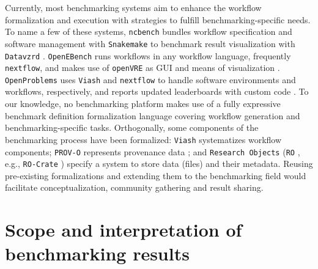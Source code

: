 \documentclass[11pt]{article}
\begin{document}
Currently, most benchmarking systems aim to enhance the workflow formalization and execution with strategies to fulfill benchmarking-specific needs. To name a few of these systems, \texttt{ncbench} bundles workflow specification and software management with \texttt{Snakemake} to benchmark result visualization with \texttt{Datavzrd} \cite{Hanssen2023-uf}. \texttt{OpenEBench} runs workflows in any workflow language, frequently \texttt{nextflow}, and makes use of \texttt{openVRE} as GUI and means of visualization \cite{Capella-Gutierrez2017-dh}. \texttt{OpenProblems} uses \texttt{Viash} \cite{cannoodt2024viash} and \texttt{nextflow} to handle software environments and workflows, respectively, and reports updated leaderboards with custom code \cite{luecken2025open}. To our knowledge, no benchmarking platform makes use of a fully expressive benchmark definition formalization language covering workflow generation and benchmarking-specific tasks. Orthogonally, some components of the benchmarking process have been formalized: \texttt{Viash} \cite{cannoodt2024viash} systematizes workflow components; \texttt{PROV-O} represents provenance data \cite{LeboUnknown-om}; and \texttt{Research Objects} (\texttt{RO} \cite{bechhofer2013linked}, e.g., \texttt{RO-Crate} \cite{soiland2022packaging}) specify a system to store data (files) and their metadata. Reusing pre-existing formalizations and extending them to the benchmarking field would facilitate conceptualization, community gathering and result sharing.

\section*{Scope and interpretation of benchmarking results}
\end{document}
